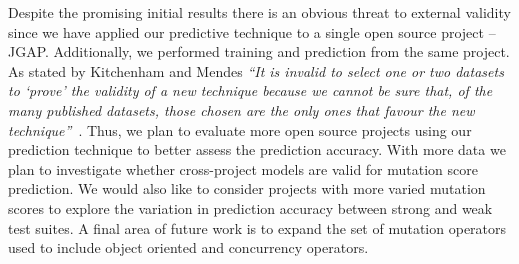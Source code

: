 Despite the promising initial results there is an obvious threat to external validity since we have applied our predictive technique to a single open source project -- JGAP. Additionally, we performed training and prediction from the same project. As stated by Kitchenham and Mendes \textit{``It is invalid to select one or two datasets to `prove' the validity of a new technique because we cannot be sure that, of the many published datasets, those chosen are the only ones that favour the new technique''}~\cite{KM09}. Thus, we plan to evaluate more open source projects using our prediction technique to better assess the prediction accuracy. With more data we plan to investigate whether cross-project models are valid for mutation score prediction. We would also like to consider projects with more varied mutation scores to explore the variation in prediction accuracy between strong and weak test suites. A final area of future work is to expand the set of mutation operators used to include object oriented and concurrency operators.
